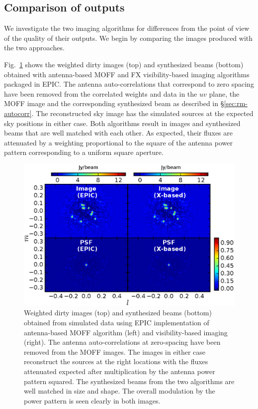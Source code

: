 \documentclass[a4paper,fleqn,usenatbib]{mnras}
\begin{document}
\subsection{Comparison of outputs}\label{sec:diff}

We investigate the two imaging algorithms for differences from the point of view of the quality of their outputs. We begin by comparing the images produced with the two approaches. 

Fig.~\ref{fig:MOFF-FX-image} shows the weighted dirty images (top) and synthesized beams (bottom) obtained with antenna-based MOFF and FX visibility-based imaging algorithms packaged in EPIC. The antenna auto-correlations that correspond to zero spacing have been removed from the correlated weights and data in the $uv$ plane, the MOFF image and the corresponding synthesized beam as described in \S\ref{sec:rm-autocorr}. The reconstructed sky image has the simulated sources at the expected sky positions in either case. Both algorithms result in images and synthesized beams that are well matched with each other. As expected, their fluxes are attenuated by a weighting proportional to the square of the antenna power pattern corresponding to a uniform square aperture.

\begin{figure}
  \includegraphics[width=\columnwidth]{figure5}
  \caption{Weighted dirty images (top) and synthesized beams (bottom) obtained from simulated data using EPIC implementation of antenna-based MOFF algorithm (left) and visibility-based imaging (right). The antenna auto-correlations at zero-spacing have been removed from the MOFF images. The images in either case reconstruct the sources at the right locations with the fluxes attenuated expected after multiplication by the antenna power pattern squared. The synthesized beams from the two algorithms are well matched in size and shape. The overall modulation by the power pattern is seen clearly in both images.}
  \label{fig:MOFF-FX-image}
\end{figure}
\end{document}
